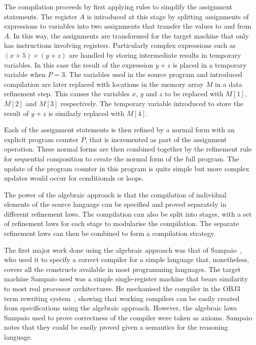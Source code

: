 The compilation proceeds by first applying rules to simplify the
assignment statements.
The register $A$ is introduced at this stage by splitting assignments
of expressions to variables into two assignments that transfer the
values to and from $A$.
In this way, the assignments are transformed for the target machine
that only has instructions involving registers.
Particularly complex expressions such as $(x + 5) \times (y + z)$ are
handled by storing intermediate results in temporary variables.
In this case the result of the expression $y + z$ is placed in a
temporary variable when $P = 3$.
The variables used in the source program and introduced compilation
are later replaced with locations in the memory array $M$ in a data
refinement step.
This causes the variables $x$, $y$ and $z$ to be replaced with $M[1]$,
$M[2]$ and $M[3]$ respectively.
The temporary variable introduced to store the result of $y + z$ is
similarly replaced with $M[4]$.

Each of the assignment statements is then refined by a normal form
with an explicit program counter $P$, that is incremented as part of
the assignment operation.
These normal forms are then combined together by the refinement rule
for sequential composition to create the normal form of the full
program.
The update of the program counter in this program is quite simple but
more complex updates would occur for conditionals or loops.

The power of the algebraic approach is that the compilation of
individual elements of the source language can be specified and proved
separately in different refinement laws.
The compilation can also be split into stages, with a set of
refinement laws for each stage to modularise the compilation.
The separate refinement laws can then be combined to form a
compilation strategy.

The first major work done using the algebraic approach was that of
Sampaio~\cite{sampaio1993}, who used it to specify a correct compiler
for a simple language that, nonetheless, covers all the constructs
available in most programming languages.
The target machine Sampaio used was a simple single-register machine
that bears similarity to most real processor architectures.
He mechanised the compiler in the OBJ3 term rewriting
system~\cite{goguen1988}, showing that working compilers can be easily
created from specifications using the algebraic approach.
However, the algebraic laws Sampaio used to prove correctness of the
compiler were taken as axioms.
Sampaio notes that they could be easily proved given a semantics for
the reasoning language.

